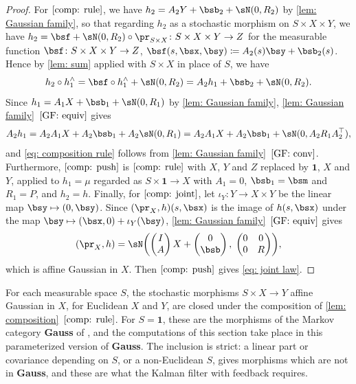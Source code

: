 \documentclass[12pt,reqno]{amsart}%
\theoremstyle{plain}
\theoremstyle{definition}
\def\bsone{\boldsymbol{1}}
\begin{document}
\begin{proof}
	For $\ref{comp: rule}$, we have $h_2=A_2Y+\bsb_2+\sN(0,R_2)$ by \cref{lem: Gaussian family}, so that
	regarding $h_2$ as a stochastic morphism on $S\times X\times Y$, we have
	$h_2=\bsf+\sN(0,R_2)\circ\pr_{S\times X}\colon S\times X\times Y\rightarrow Z$ for the measurable function
	$\bsf\colon S\times X\times Y\rightarrow Z$, $\bsf(s,\bsx,\bsy)\coloneqq A_2(s)\bsy+\bsb_2(s)$.
	Hence by \cref{lem: sum} applied with $S\times X$ in place of $S$, we have
	\[
		h_2\circ h_1^\wedge=\bsf\circ h_1^\wedge+\sN(0,R_2)=A_2h_1+\bsb_2+\sN(0,R_2).
	\]
	Since $h_1=A_1X+\bsb_1+\sN(0,R_1)$ by \cref{lem: Gaussian family},
	\cref{lem: Gaussian family}~$\ref{GF: equiv}$ gives
	\[
		A_2h_1=A_2A_1X+A_2\bsb_1+A_2\sN(0,R_1)=A_2A_1X+A_2\bsb_1+\sN(0,A_2R_1A_2^{\top}),
	\]
	and \eqref{eq: composition rule} follows from \cref{lem: Gaussian family}~$\ref{GF: conv}$.
	Furthermore,
	$\ref{comp: push}$ is $\ref{comp: rule}$ with $X$, $Y$ and $Z$ replaced by $\bsone$, $X$ and $Y$,
	applied to $h_1=\mu$ regarded as $S\times\bsone\rightarrow X$ with $A_1=0$, $\bsb_1=\bsm$ and $R_1=P$, and $h_2=h$.
	Finally,
	for $\ref{comp: joint}$, 
	let $\iota_Y\colon Y\rightarrow X\times Y$ be the linear map $\bsy\mapsto(0,\bsy)$.
	Since $(\pr_X,h)(s,\bsx)$ is the image of $h(s,\bsx)$ under the map $\bsy\mapsto(\bsx,0)+\iota_Y(\bsy)$,
	\cref{lem: Gaussian family}~$\ref{GF: equiv}$ gives
	\[
		(\pr_X,h)=\sN\biggl(\begin{pmatrix}I\\A\end{pmatrix}X+\begin{pmatrix}0\\ \bsb\end{pmatrix},\;\begin{pmatrix}0&0\\0&R\end{pmatrix}\biggr),
	\]
	which is affine Gaussian in $X$.  Then $\ref{comp: push}$ gives \eqref{eq: joint law}.
\end{proof}

\begin{remark}
	For each measurable space $S$, the stochastic morphisms $S\times X\to Y$ affine Gaussian in $X$, for Euclidean $X$ and $Y$, are closed under the composition of \cref{lem: composition}~$\ref{comp: rule}$. For $S=\bsone$, these are the morphisms of the Markov category \textbf{Gauss} of \cite[\S6]{F20}, and the computations of this section take place in this parameterized version of \textbf{Gauss}.
	The inclusion is strict: a linear part or covariance depending on $S$, or a non-Euclidean $S$, gives morphisms which are not in \textbf{Gauss}, and these are what the Kalman filter with feedback requires.
\end{remark}
\end{document}
